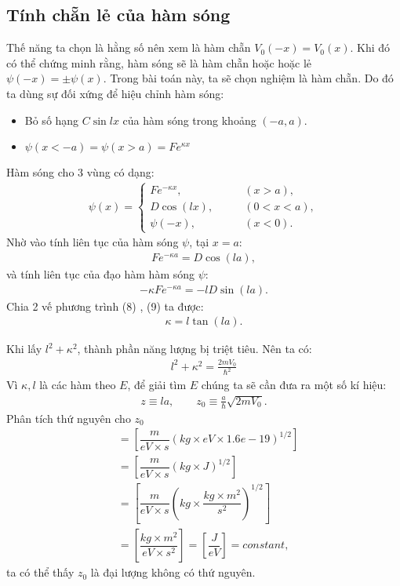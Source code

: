 \documentclass{article}
\begin{document}
	\subsection{Tính chẵn lẻ của hàm sóng}
	Thế năng ta chọn là hằng số nên xem là hàm chẵn $V_0(-x)=V_0(x)$. Khi đó có thể chứng minh rằng, hàm sóng sẽ là hàm chẵn hoặc hoặc lẻ $\psi (-x) = \pm \psi (x)$. Trong bài toán này, ta sẽ chọn nghiệm là hàm chẵn. Do đó ta dùng sự đối xứng để hiệu chỉnh hàm sóng:
	\begin{itemize}
		\item Bỏ số hạng $C \sin{lx}$ của hàm sóng trong khoảng $(-a,a)$.
		\item $\psi(x < -a) = \psi( x > a )=F e^{ \kappa x }$
	\end{itemize} 
	Hàm sóng cho 3 vùng có dạng:
	\begin{align}
		\psi(x) =
		\begin{cases}
			F e^{-\kappa x} ,&\quad \quad (x>a),\\
			D \cos (lx) , &\quad \quad (0<x<a),\\
			\psi(-x), &\quad \quad (x<0).
		\end{cases}
	\end{align}
	Nhờ vào tính liên tục của hàm sóng $\psi$, tại $x = a$:
	\begin{align}
		F e^{-\kappa a} = D \cos (la),
	\end{align}
	và tính liên tục của đạo hàm hàm sóng $\psi$:
	\begin{align}
		-\kappa F e^{-\kappa a} = -l D \sin (la).
	\end{align}
	Chia 2 vế phương trình (8) , (9) ta được:
	\begin{align}
		\kappa = l \tan (la).
	\end{align}
	
	Khi lấy $l^2 + \kappa ^2$, thành phần năng lượng bị triệt tiêu. Nên ta có:
	\begin{align}
		l^2 + \kappa^2 = \frac{2mV_0}{\hbar^2}
	\end{align}
	Vì $\kappa ,l$ là các hàm theo $E$, để giải tìm $E$ chúng ta sẽ cần đưa ra một số kí hiệu:
	\begin{align}
		z \equiv la, \quad \quad z_0 \equiv \frac{a}{\hbar} \sqrt{2mV_0} .
	\end{align}
	Phân tích thứ nguyên cho $z_0$
	\begin{align}
		[z_0] &= \left[ \dfrac{m}{eV\times s} (kg \times eV \times 1.6e-19)^{1/2}  \right] \nonumber \\
		& = \left[ \dfrac{m}{eV\times s} (kg \times J)^{1/2}  \right] \nonumber \\
		& = \left[ \dfrac{m}{eV\times s} (kg \times \dfrac{kg \times m^2}{s^2})^{1/2}  \right] \nonumber\\
		& = \left[ \dfrac{kg\times m^2}{eV\times s^2}\right]  = \left[\dfrac{J}{eV}\right] = constant,
	\end{align}
	ta có thể thấy $z_0$ là đại lượng không có thứ nguyên.
	
\end{document}
